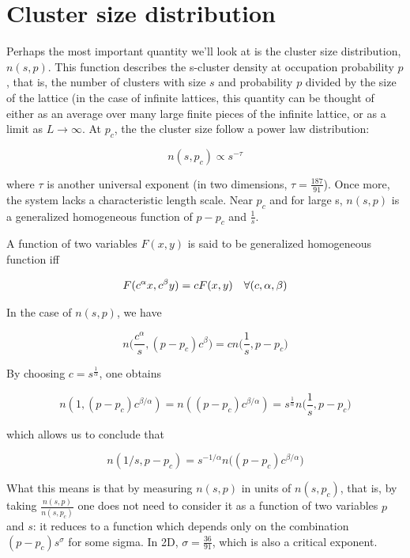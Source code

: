 \section{Cluster size distribution} 

Perhaps the most important quantity we'll look at is the cluster size distribution, $n(s, p)$. This function describes the s-cluster density at occupation probability $p$, that is, the number of clusters with size $s$ and probability $p$ divided by the size of the lattice (in the case of infinite lattices, this quantity can be thought of either as an average over many large finite pieces of the infinite lattice, or as a limit as $L \rightarrow \infty$. At $p_c$, the the cluster size follow a power law distribution:

$$
    n(s, p_c) \propto s^{-\tau}
$$

where $\tau$ is another universal exponent (in two dimensions, $\tau = \frac{187}{91}$)\cite{applications_of_percolation_theory}. Once more, the system lacks a characteristic length scale. 
Near $p_c$ and for large s, $n(s, p)$ is a generalized homogeneous function of $p - p_c$ and $\frac{1}{s}$. 

A function of two variables $F(x, y)$ is said to be generalized homogeneous function iff 

$$ 
F(c^\alpha x, c^\beta y) = c F(x, y) \hspace{0.35cm} \forall (c, \alpha, \beta)
$$

In the case of $n(s, p)$, we have 

$$
    n\bigg(\frac{c^\alpha}{s}, (p-p_c)c^\beta\bigg) = c n\bigg(\frac{1}{s}, p-p_c\bigg)
$$


By choosing $c = s^\frac{1}{\alpha}$, one obtains 


$$ 
n(1, (p-p_c) c^{\beta / \alpha}) =  n((p-p_c) c^{\beta / \alpha}) = s^\frac{1}{\alpha}n\bigg(\frac{1}{s}, p-p_c\bigg)
$$ 

which allows us to conclude that 

$$ 
n(1/s, p - p_c) = s^{-1/\alpha} n\big((p - p_c) c^{\beta / \alpha}\big)
$$ 

What this means is that by measuring $n(s, p)$ in units of $n(s, p_c)$, that is, by taking $\frac{n(s, p)}{n(s, p_c)}$ one does not need to consider it as a function of two variables $p$ and $s$: it reduces to a function which depends only on the combination $(p - p_c)s^\sigma$ for some sigma. In 2D, $\sigma = \frac{36}{91}$\cite{intro_to_percolation_theory}, which is also a critical exponent. 


